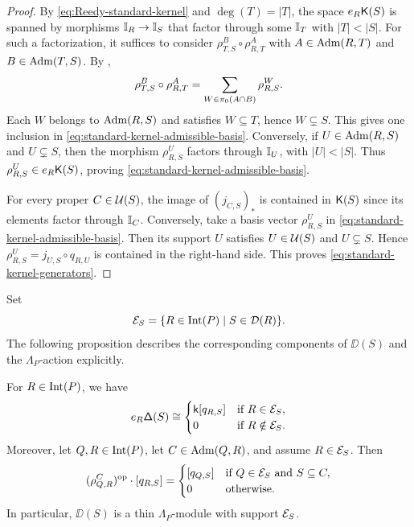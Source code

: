 \begin{proof}
By \eqref{eq:Reedy-standard-kernel} and $\deg(T)=|T|$, the space
$e_R\mathsf K(S)$ is spanned by morphisms $\mathbb I_R\to\mathbb I_S$ that factor through
some $\mathbb I_T$ with $|T|<|S|$.  For such a factorization, it suffices to
consider
$\rho_{T,S}^{B}\circ\rho_{R,T}^{A}$ with
$A\in\operatorname{Adm}(R,T)$ and $B\in\operatorname{Adm}(T,S)$.  By
,
\[
\rho_{T,S}^{B}\circ\rho_{R,T}^{A}
=
\sum_{W\in\pi_0(A\cap B)}\rho_{R,S}^{W}.
\]
Each $W$ belongs to $\operatorname{Adm}(R,S)$ and satisfies
$W\subseteq T$, hence $W\subsetneq S$.  This gives one inclusion in
\eqref{eq:standard-kernel-admissible-basis}.  Conversely, if
$U\in\operatorname{Adm}(R,S)$ and $U\subsetneq S$, then
the morphism $\rho_{R,S}^{U}$
factors through $\mathbb I_U$, with $|U|<|S|$.  Thus
$\rho_{R,S}^{U}\in e_R\mathsf K(S)$, proving
\eqref{eq:standard-kernel-admissible-basis}.

For every proper $C\in\mathcal U(S)$, the image of $(j_{C,S})_*$ is contained
in $\mathsf K(S)$ since its elements factor through $\mathbb I_C$.  Conversely, take a basis vector $\rho_{R,S}^{U}$ in
\eqref{eq:standard-kernel-admissible-basis}. 
Then its support $U$ satisfies $U\in\mathcal U(S)$ and $U\subsetneq S$. Hence $\rho_{R,S}^{U}= j_{U,S} \circ q_{R,U}$ is contained in the right-hand side. 
This proves
\eqref{eq:standard-kernel-generators}.
\end{proof}




Set
\begin{equation}
\mathcal E_S
=
\{R\in\operatorname{Int}(P)\mid S\in\mathcal D(R)\}.
\label{eq:standard-support-set}
\end{equation}
The following proposition describes the corresponding components of
$\DD(S)$ and the $\Lambda_P$-action explicitly.


\begin{proposition}
\label{prop:standard-concrete-model}
For $R\in \operatorname{Int}(P)$, we have
\begin{equation}
e_R\mathsf\Delta(S)
\cong
\begin{cases}
\mathsf{k}[q_{R,S}] & \text{if } R\in\mathcal E_S,\\
0            & \text{if } R\notin\mathcal E_S.
\end{cases}
\label{eq:standard-components-explicit}
\end{equation}
Moreover, let $Q,R\in\operatorname{Int}(P)$, let $C\in\operatorname{Adm}(Q,R)$, and assume
$R\in\mathcal E_S$. Then
\begin{equation}
(\rho_{Q,R}^{C})^{\mathrm{op}}\cdot[q_{R,S}]
=
\begin{cases}
[q_{Q,S}] & \text{if } Q\in\mathcal E_S \text{ and } S\subseteq C,\\
0         & \text{otherwise.}
\end{cases}
\label{eq:standard-action-explicit}
\end{equation}
In particular, $\DD(S)$ is a thin $\Lambda_P$-module with support $\mathcal E_S$.
\end{proposition}

